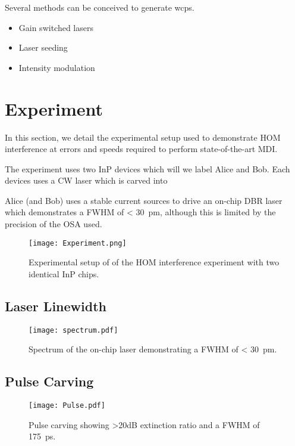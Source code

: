 Several methods can be conceived to generate \acp{wcp}.

\begin{itemize}
	\item Gain switched lasers
	\item Laser seeding
	\item Intensity modulation
\end{itemize}

\section{Experiment}

In this section, we detail the experimental setup used to demonstrate \ac{HOM} interference at errors and speeds required to perform state-of-the-art \ac{MDI}.

The experiment uses two \ac{InP} devices which will we label Alice and Bob. Each devices uses a \ac{CW} laser which is carved into  

Alice (and Bob) uses a stable current sources to drive an on-chip \ac{DBR} laser which demonstrates a \ac{FWHM} of < \SI{30}{\pico\metre}, although this is limited by the precision of the \ac{OSA} used.

\begin{figure}[tbp]
	\centering
	\texttt{[image: Experiment.png]}
	\caption[HOM experimental setup]{Experimental setup of of the \ac{HOM} interference experiment with two identical \ac{InP} chips.}
	\label{fig:hom_experiment}
\end{figure}

\subsection{Laser Linewidth}

\begin{figure}[tbp]
	\centering
	\texttt{[image: spectrum.pdf]}
	\caption[Laser spectrum]{Spectrum of the on-chip laser demonstrating a \ac{FWHM} of < \SI{30}{\pico\metre}.}
	\label{fig:spectrum}
\end{figure}

\subsection{Pulse Carving}

\begin{figure}[tbp]
	\centering
	\texttt{[image: Pulse.pdf]}
	\caption[Pulse carving]{Pulse carving showing >20dB extinction ratio and a \ac{FWHM} of \SI{175}{\pico\second}.}
	\label{fig:pulses}
\end{figure}

